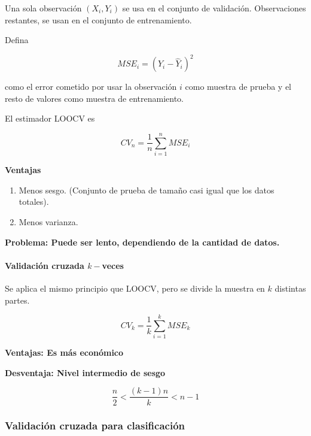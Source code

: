 \documentclass[
  12pt,
]{book}
\providecommand{\tightlist}{%
  \setlength{\itemsep}{0pt}\setlength{\parskip}{0pt}}
\theoremstyle{definition}
\theoremstyle{definition}
\theoremstyle{definition}
\theoremstyle{remark}
\begin{document}
Una sola observación \(\left( X_{i}, Y_{i} \right)\) se usa en el conjunto de validación. Observaciones restantes, se usan en el conjunto de entrenamiento.

Defina

\begin{equation*}
MSE_{i} =(Y_{i}-\hat{Y}_{i})^{2}
\end{equation*}

como el error cometido por usar la observación \(i\) como muestra de prueba y el resto de valores como muestra de entrenamiento.

El estimador LOOCV es

\begin{equation*}
CV_{n} = \frac{1}{n} \sum_{i=1}^{n} MSE_{i}
\end{equation*}

\textbf{Ventajas}

\begin{enumerate}
\def\labelenumi{\arabic{enumi}.}
\tightlist
\item
  Menos sesgo. (Conjunto de prueba de tamaño casi igual que los datos totales).
\item
  Menos varianza.
\end{enumerate}

\textbf{Problema: Puede ser lento, dependiendo de la cantidad de datos.}

\hypertarget{validaciuxf3n-cruzada-k-veces}{%
\paragraph{\texorpdfstring{Validación cruzada \(k-\)veces}{Validación cruzada k-veces}}\label{validaciuxf3n-cruzada-k-veces}}

Se aplica el mismo principio que LOOCV, pero se divide la muestra en \(k\) distintas partes.

\begin{equation*}
CV_{k} = \frac{1}{k} \sum_{i=1}^{k} MSE_{k}
\end{equation*}

\textbf{Ventajas: Es más económico}

\textbf{Desventaja: Nivel intermedio de sesgo}

\begin{equation*}
\frac{n}{2} < \frac{(k-1)n}{k} < n-1
\end{equation*}

\hypertarget{validaciuxf3n-cruzada-para-clasificaciuxf3n}{%
\subsubsection{Validación cruzada para clasificación}\label{validaciuxf3n-cruzada-para-clasificaciuxf3n}}
\end{document}
